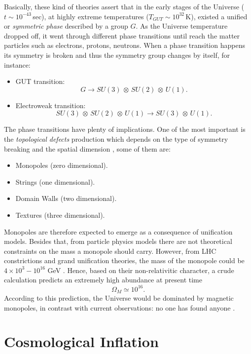 \documentclass{rmaa}
\begin{document}
Basically, these kind of theories assert that in the early stages of the Universe ($t \sim 10^{-43}\, $sec), 
at highly extreme temperatures ($T_{GUT}\sim 10^{32} \, $K), existed a unified or 
\textit{symmetric phase} described by a group $G$. As the Universe
temperature dropped off, it went through different phase transitions until reach 
the matter particles such as electrons, protons, neutrons.
%
When a phase transition happens its symmetry is broken and thus the symmetry group changes by itself,
for instance: 
 \begin{itemize}
 \item GUT transition: $$G \to SU(3)\,\otimes\, SU(2)\, \otimes \, U(1).$$
 \item Electroweak transition: $$SU(3)\,\otimes\, SU(2)\, \otimes \, U(1) \to SU(3)\, \otimes \, U(1).$$ 
\end{itemize}

\noindent
The phase transitions have plenty of implications. One of the most important is the
\textit{topological defects} production which depends on the type of symmetry breaking 
and the spatial dimension \citep{Vilenkin}, some of them are:   

\begin{itemize}
\item Monopoles (zero dimensional).
\item Strings (one dimensional).
\item Domain Walls (two dimensional).
\item Textures (three dimensional).
\end{itemize}

\noindent
Monopoles are therefore expected to emerge as a consequence of unification models. 
Besides that, from particle physics models there are not theoretical constraints on the mass 
a monopole should carry. However, from LHC constrictions and grand unification theories, 
the mass of the monopole could be $4\times 10^3-10^{16}$ GeV \citep{monopole}. Hence, 
based on their non-relativitic character, 
a crude calculation predicts an extremely high abundance at present time \citep{Coles}
$$
\Omega_M \simeq 10^{16}.
$$
%
According to this prediction, the Universe would be dominated by magnetic monopoles,
in contrast with current observations: no one has found anyone \citep{Ambrosio02}. 
\\


\section{Cosmological Inflation}
\vskip 6pt
\end{document}
